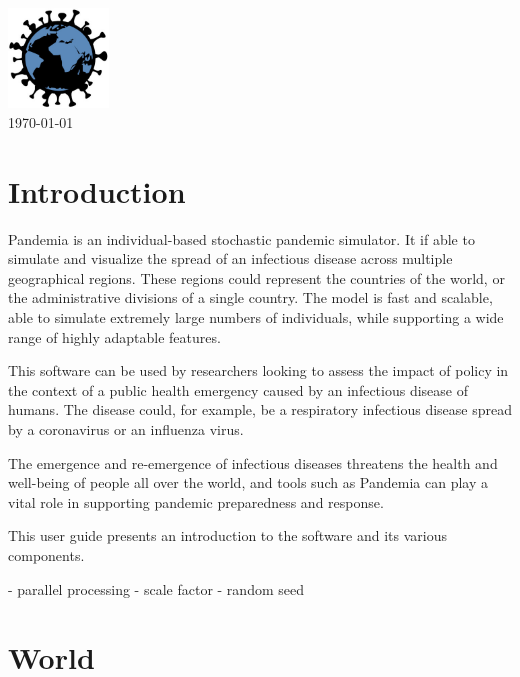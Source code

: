 \documentclass[10pt,letterpaper]{article}
\begin{document}
\vspace*{0.2in}

\begin{centering}
{\Huge\textbf{}}
\\
\bigskip
\includegraphics[width=0.2\textwidth]{pandemia_logo}
\\
\bigskip
\today
\\
\end{centering}

\tableofcontents

\section{Introduction}

Pandemia is an individual-based stochastic pandemic simulator. It if able to simulate and visualize the spread of an infectious disease across multiple geographical regions. These regions could represent the countries of the world, or the administrative divisions of a single country. The model is fast and scalable, able to simulate extremely large numbers of individuals, while supporting a wide range of highly adaptable features.

This software can be used by researchers looking to assess the impact of policy in the context of a public health emergency caused by an infectious disease of humans. The disease could, for example, be a respiratory infectious disease spread by a coronavirus or an influenza virus.

The emergence and re-emergence of infectious diseases threatens the health and well-being of people all over the world, and tools such as Pandemia can play a vital role in supporting pandemic preparedness and response.

This user guide presents an introduction to the software and its various components.

- parallel processing
- scale factor
- random seed

\section{World}
\end{document}
